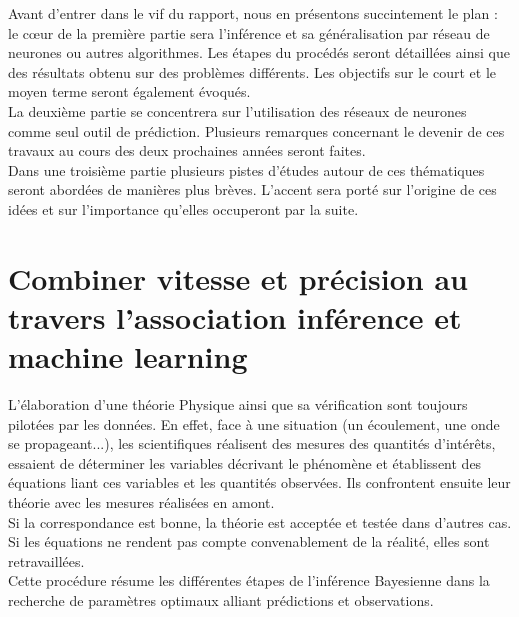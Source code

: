 \documentclass[a4paper,12pt]{article}
\newcommand\bk{\color{black}}
\newcommand\navy{\color{navy}}
\numberwithin{equation}{section} %
\begin{document}

\noindent Avant d'entrer dans le vif du rapport, nous en présentons succintement le plan : le cœur de la première partie sera l'inférence et sa généralisation par réseau de neurones ou autres algorithmes. Les étapes du procédés seront détaillées ainsi que des résultats obtenu sur des problèmes différents. Les objectifs sur le court et le moyen terme seront également évoqués.\\
La deuxième partie se concentrera sur l'utilisation des réseaux de neurones comme seul outil de prédiction. Plusieurs remarques concernant le devenir de ces travaux au cours des deux prochaines années seront faites.\\
Dans une troisième partie plusieurs pistes d'études autour de ces thématiques seront abordées de manières plus brèves. L'accent sera porté sur l'origine de ces idées et sur l'importance qu'elles occuperont par la suite.

\pagebreak

\navy \section{Combiner vitesse et précision au travers l'association inférence et machine learning} \label{combiNN_inference}
 \bk
\noindent L'élaboration d'une théorie Physique ainsi que sa vérification sont toujours pilotées par les données. En effet, face à une situation (un écoulement, une onde se propageant...), les scientifiques réalisent des mesures des quantités d'intérêts, essaient de déterminer les variables décrivant le phénomène et établissent des équations liant ces variables et les quantités observées. Ils confrontent ensuite leur théorie avec les mesures réalisées en amont. \\
Si la correspondance est bonne, la théorie est acceptée et testée dans d'autres cas. Si les équations ne rendent pas compte convenablement de la réalité, elles sont retravaillées. \\
Cette procédure résume les différentes étapes de l'inférence Bayesienne dans la recherche de paramètres optimaux alliant prédictions et observations.
 
\end{document}
